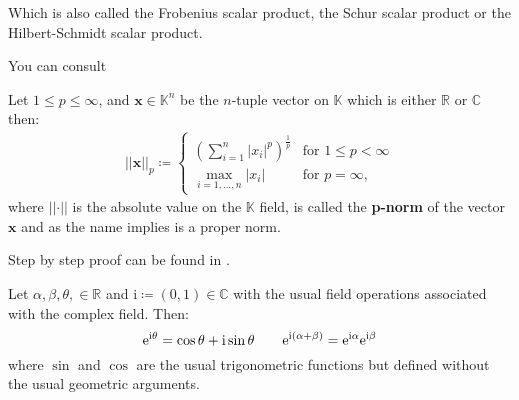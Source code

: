Which is also called the Frobenius scalar product, the Schur scalar product or 
the Hilbert-Schmidt scalar product.

\begin{Proof}
    You can consult \cite{Frazier1999}\cite{Horn2012}\cite{Hackbusch2019}
\end{Proof}
\begin{Def}\label{def:p-norm}
    Let $1 \leq p \leq \infty$, and $\boldsymbol{x} \in \mathbb{K}^n$ be the $n$-tuple vector on $\mathbb{K}$ which is either $\mathbb{R}$ or $\mathbb{C}$ then:
    \begin{equation*}
        \begin{split} 
            \left|\left|\boldsymbol{x}\right|\right|_p \coloneqq    
            \begin{cases}
                \left(\sum_{i=1}^{n}\left|x_i\right|^p\right)^{\frac{1}{p}} & \text{for } 1 \leq p < \infty\\
                \underset{{i=1,\dots,n}}{\max} \left|x_i\right| & \text{for } p = \infty,
            \end{cases}
        \end{split}
    \end{equation*}
    where $\left|\left|\boldsymbol{\cdot}\right|\right|$ is the absolute value on the $\mathbb{K}$ field,
    is called the \textbf{p-norm} of the vector $\boldsymbol{x}$ and as the name implies is a proper norm.
\end{Def}
\begin{Proof}
    Step by step proof can be found in \cite{Alt2016}.
\end{Proof}
\begin{Thm}\label{theorem:euler_formula}
    Let $\alpha,\beta,\theta, \in \mathbb{R}$ and $\mathrm{i} \coloneqq (0,1) \in \mathbb{C}$ with the usual field operations associated with the 
	complex field. Then:
	\begin{equation*}
		\mathrm{e}^{\mathrm{i}\theta} = \cos \theta +  \mathrm{i}\sin \theta \qquad  \mathrm{e}^{\mathrm{i}(\alpha+\beta)} = \mathrm{e}^{\mathrm{i}\alpha}\mathrm{e}^{\mathrm{i}\beta}\index{Euler formula}\index{Function!$\exp$}\index{Function!$\sin$}\index{Function!$\cos$}
	\end{equation*}
    where $\sin$ and $\cos$ are the usual trigonometric functions but defined without the usual geometric arguments.
	\end{Thm}
